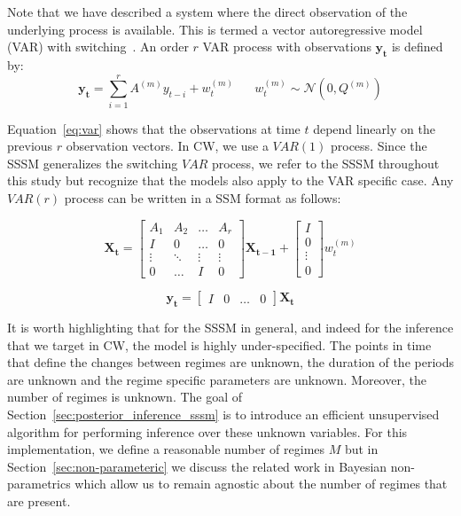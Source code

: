 Note that we have described a system where the direct observation of the underlying process is available. This is termed a vector autoregressive model (VAR) with switching~\citep{fox2009nonparametric, shumway2000time,kim1994dynamic}. An order $r$ VAR process with observations $\mathbf{y_t}$ is defined by:
\begin{equation}\label{eq:var}
  \mathbf{y_t} = \sum\limits_{i=1}^{r} A^{(m)}y_{t-i} + w^{(m)}_t \hspace{20pt} w^{(m)}_t \sim \mathcal{N}(0, Q^{(m)})
\end{equation}

Equation~\ref{eq:var} shows that the observations at time $t$ depend linearly on the previous $r$ observation vectors. In CW, we use a $VAR(1)$ process. Since the SSSM generalizes the switching $VAR$ process, we refer to the SSSM throughout this study but recognize that the models also apply to the VAR specific case. Any $VAR(r)$ process can be written in a SSM format as follows:

\begin{equation}\label{eq:ssm_rep_of_var_state}
  \mathbf{X_t} =
  \begin{bmatrix}
      A_{1}       & A_{2} &  \dots & A_{r} \\
      I           & 0     &  \dots & 0 \\
      \vdots      & \ddots&  \vdots& \vdots \\
      0           & \hdots&   I    & 0
    \end{bmatrix} \mathbf{X_{t-1}} +
  \begin{bmatrix}
    I \\
    0 \\
    \vdots \\
    0
  \end{bmatrix} w^{(m)}_t
\end{equation}

\begin{equation}\label{eq:ssm_rep_of_var_output}
  \mathbf{y_t} = \begin{bmatrix} I & 0 & \hdots & 0 \end{bmatrix} \mathbf{X_t}
\end{equation}

It is worth highlighting that for the SSSM in general, and indeed for the inference that we target in CW, the model is highly under-specified. The points in time that define the changes between regimes are unknown, the duration of the periods are unknown and the regime specific parameters are unknown. Moreover, the number of regimes is unknown. The goal of Section~\ref{sec:posterior_inference_sssm} is to introduce an efficient unsupervised algorithm for performing inference over these unknown variables. For this implementation, we define a reasonable number of regimes $M$ but in Section~\ref{sec:non-parameteric} we discuss the related work in Bayesian non-parametrics which allow us to remain agnostic about the number of regimes that are present.


